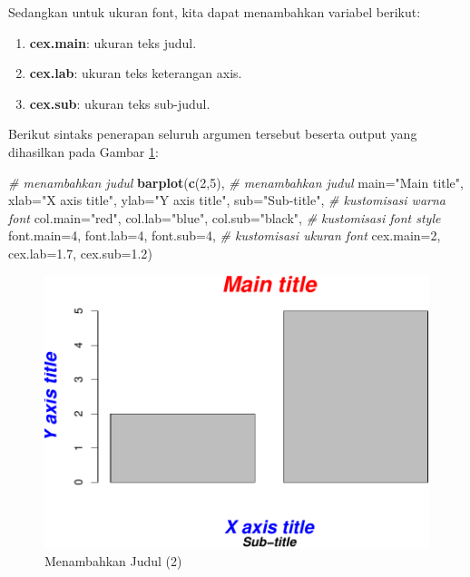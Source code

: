 \documentclass[]{book}
\newenvironment{Shaded}{\begin{snugshade}}{\end{snugshade}}
\newcommand{\KeywordTok}[1]{\textcolor[rgb]{0.13,0.29,0.53}{\textbf{#1}}}
\newcommand{\DataTypeTok}[1]{\textcolor[rgb]{0.13,0.29,0.53}{#1}}
\newcommand{\DecValTok}[1]{\textcolor[rgb]{0.00,0.00,0.81}{#1}}
\newcommand{\FloatTok}[1]{\textcolor[rgb]{0.00,0.00,0.81}{#1}}
\newcommand{\StringTok}[1]{\textcolor[rgb]{0.31,0.60,0.02}{#1}}
\newcommand{\CommentTok}[1]{\textcolor[rgb]{0.56,0.35,0.01}{\textit{#1}}}
\newcommand{\NormalTok}[1]{#1}
\providecommand{\tightlist}{%
  \setlength{\itemsep}{0pt}\setlength{\parskip}{0pt}}
\begin{document}
Sedangkan untuk ukuran font, kita dapat menambahkan variabel berikut:

\begin{enumerate}
\def\labelenumi{\alph{enumi}.}
\tightlist
\item
  \textbf{cex.main}: ukuran teks judul.
\item
  \textbf{cex.lab}: ukuran teks keterangan axis.
\item
  \textbf{cex.sub}: ukuran teks sub-judul.
\end{enumerate}

Berikut sintaks penerapan seluruh argumen tersebut beserta output yang
dihasilkan pada Gambar \ref{fig:title2}:

\begin{Shaded}
\begin{Highlighting}[]
\CommentTok{# menambahkan judul}
\KeywordTok{barplot}\NormalTok{(}\KeywordTok{c}\NormalTok{(}\DecValTok{2}\NormalTok{,}\DecValTok{5}\NormalTok{), }
        \CommentTok{# menambahkan judul}
        \DataTypeTok{main=}\StringTok{"Main title"}\NormalTok{,}
        \DataTypeTok{xlab=}\StringTok{"X axis title"}\NormalTok{,}
        \DataTypeTok{ylab=}\StringTok{"Y axis title"}\NormalTok{,}
        \DataTypeTok{sub=}\StringTok{"Sub-title"}\NormalTok{,}
        \CommentTok{# kustomisasi warna font}
        \DataTypeTok{col.main=}\StringTok{"red"}\NormalTok{, }
        \DataTypeTok{col.lab=}\StringTok{"blue"}\NormalTok{, }
        \DataTypeTok{col.sub=}\StringTok{"black"}\NormalTok{,}
        \CommentTok{# kustomisasi font style}
        \DataTypeTok{font.main=}\DecValTok{4}\NormalTok{, }
        \DataTypeTok{font.lab=}\DecValTok{4}\NormalTok{, }
        \DataTypeTok{font.sub=}\DecValTok{4}\NormalTok{,}
        \CommentTok{# kustomisasi ukuran font}
        \DataTypeTok{cex.main=}\DecValTok{2}\NormalTok{, }
        \DataTypeTok{cex.lab=}\FloatTok{1.7}\NormalTok{, }
        \DataTypeTok{cex.sub=}\FloatTok{1.2}\NormalTok{)}
\end{Highlighting}
\end{Shaded}

\begin{figure}

{\centering \includegraphics[width=0.7\linewidth]{EnvStat_files/figure-latex/title2-1} 

}

\caption{Menambahkan Judul (2)}\label{fig:title2}
\end{figure}
\end{document}
